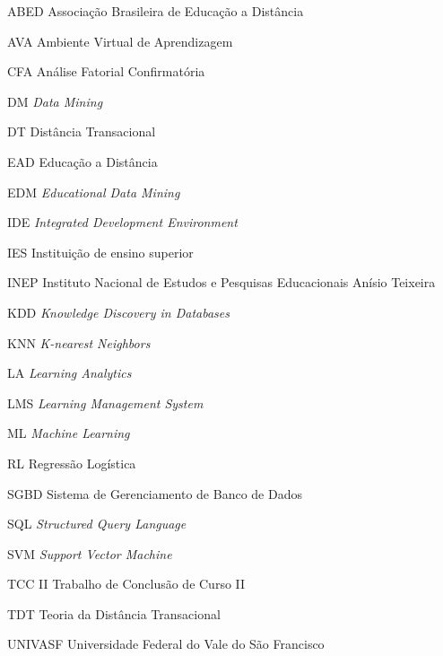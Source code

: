 \begin{siglas}
  \item[ABED] Associação Brasileira de Educação a Distância
  \item[AVA] Ambiente Virtual de Aprendizagem
  \item[CFA] Análise Fatorial Confirmatória
  \item[DM] \textit{Data Mining}
  \item[DT] Distância Transacional
  \item[EAD] Educação a Distância
  \item[EDM] \textit{Educational Data Mining}
  \item[IDE] \textit{Integrated Development Environment}
  \item[IES] Instituição de ensino superior
  \item[INEP] Instituto Nacional de Estudos e Pesquisas Educacionais Anísio Teixeira
  \item[KDD] \textit{Knowledge Discovery in Databases}
  \item[KNN] \textit{K-nearest Neighbors}
  \item[LA] \textit{Learning Analytics}
  \item[LMS] \textit{Learning Management System}
  \item[ML] \textit{Machine Learning}
  \item[RL] Regressão Logística
  \item[SGBD] Sistema de Gerenciamento de Banco de Dados
  \item[SQL] \textit{Structured Query Language}
  \item[SVM] \textit{Support Vector Machine}
  \item[TCC II] Trabalho de Conclusão de Curso II
  \item[TDT] Teoria da Distância Transacional
  \item[UNIVASF] Universidade Federal do Vale do São Francisco
\end{siglas}

\tableofcontents*
\cleardoublepage
